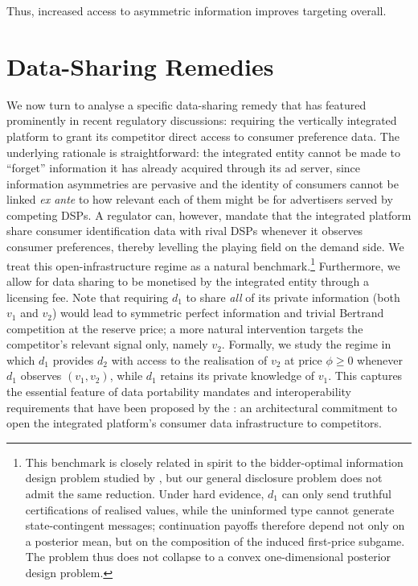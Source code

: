 \documentclass[11pt]{article}
\theoremstyle{plain}
\theoremstyle{definition}
\theoremstyle{plain}
\theoremstyle{plain}
\theoremstyle{plain}
\theoremstyle{plain}
\numberwithin{equation}{section}
\begin{document}
\noindent Thus, increased access to asymmetric information improves targeting overall.
\newpage 
\section{Data-Sharing Remedies}\label{sec:data-sharing}\label{licensing}

\noindent We now turn to analyse a specific data-sharing remedy that has featured prominently in recent regulatory discussions: requiring the vertically integrated platform to grant its competitor direct access to consumer preference data. The underlying rationale is straightforward: the integrated entity cannot be made to ``forget'' information it has already acquired through its ad server, since information asymmetries are pervasive and the identity of consumers cannot be linked \textit{ex ante} to how relevant each of them might be for advertisers served by competing DSPs. A regulator can, however, mandate that the integrated platform share consumer identification data with rival DSPs whenever it observes consumer preferences, thereby levelling the playing field on the demand side. We treat this open-infrastructure regime as a natural benchmark.\footnote{This benchmark is closely related in spirit to the bidder-optimal information design problem studied by \textcite{bergemannBidderOptimalInformationStructures2024}, but our general disclosure problem does not admit the same reduction. Under hard evidence, $d_1$ can only send truthful certifications of realised values, while the uninformed type cannot generate state-contingent messages; continuation payoffs therefore depend not only on a posterior mean, but on the composition of the induced first-price subgame. The problem thus does not collapse to a convex one-dimensional posterior design problem.} Furthermore, we allow for data sharing to be monetised by the integrated entity through a licensing fee. Note that requiring $d_1$ to share \textit{all} of its private information (both $v_1$ and $v_2$) would lead to symmetric perfect information and trivial Bertrand competition at the reserve price; a more natural intervention targets the competitor's relevant signal only, namely $v_2$. Formally, we study the regime in which $d_1$ provides $d_2$ with access to the realisation of $v_2$ at price $\phi \geq 0$ whenever $d_1$ observes $(v_1, v_2)$, while $d_1$ retains its private knowledge of $v_1$. This captures the essential feature of data portability mandates and interoperability requirements that have been proposed by the \textcite{competitionandmarketsauthorityOnlinePlatformsDigital2020}: an architectural commitment to open the integrated platform's consumer data infrastructure to competitors.\par
\vspace{2mm}
\end{document}
